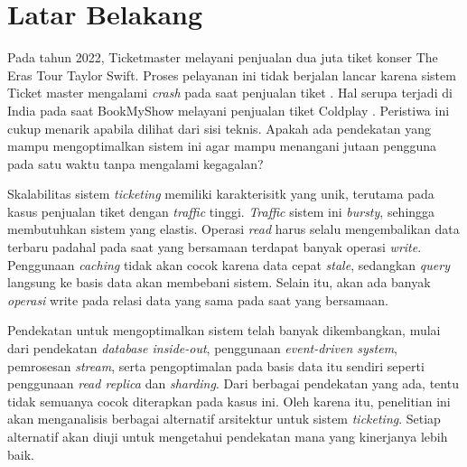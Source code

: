 \section{Latar Belakang}
\label{sec:latar-belakang}

Pada tahun 2022, Ticketmaster melayani penjualan dua juta tiket konser The Eras Tour Taylor Swift. Proses pelayanan ini tidak berjalan lancar karena sistem Ticket master mengalami \textit{crash} pada saat penjualan tiket \parencite{swiftTicketmaster}. Hal serupa terjadi di India pada saat BookMyShow melayani penjualan tiket Coldplay \parencite{coldplayBookMyShow}. Peristiwa ini cukup menarik apabila dilihat dari sisi teknis. Apakah ada pendekatan yang mampu mengoptimalkan sistem ini agar mampu menangani jutaan pengguna pada satu waktu tanpa mengalami kegagalan?

Skalabilitas sistem \textit{ticketing} memiliki karakterisitk yang unik, terutama pada kasus penjualan tiket dengan \textit{traffic} tinggi. \textit{Traffic} sistem ini \textit{bursty}, sehingga membutuhkan sistem yang elastis. Operasi \textit{read} harus selalu mengembalikan data terbaru padahal pada saat yang bersamaan terdapat banyak operasi \textit{write}. Penggunaan \textit{caching} tidak akan cocok karena data cepat \textit{stale}, sedangkan \textit{query} langsung ke basis data akan membebani sistem. Selain itu, akan ada banyak \textit{operasi} write pada relasi data yang sama pada saat yang bersamaan.

Pendekatan untuk mengoptimalkan sistem telah banyak dikembangkan, mulai dari pendekatan \textit{database inside-out}, penggunaan \textit{event-driven system}, pemrosesan \textit{stream}, serta pengoptimalan pada basis data itu sendiri seperti penggunaan \textit{read replica} dan \textit{sharding}. Dari berbagai pendekatan yang ada, tentu tidak semuanya cocok diterapkan pada kasus ini. Oleh karena itu, penelitian ini akan menganalisis berbagai alternatif arsitektur untuk sistem \textit{ticketing}. Setiap alternatif akan diuji untuk mengetahui pendekatan mana yang kinerjanya lebih baik.